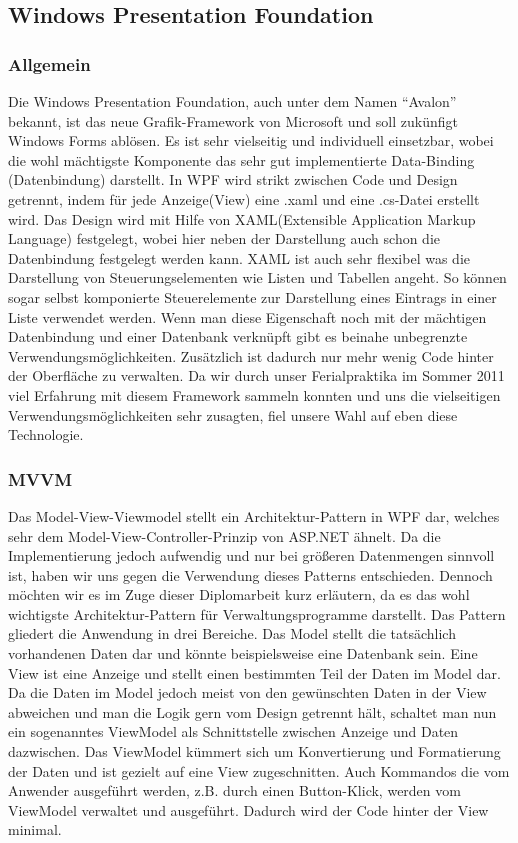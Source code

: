 \subsection{Windows Presentation Foundation}
\subsubsection{Allgemein}
Die Windows Presentation Foundation, auch unter dem Namen “Avalon” bekannt, ist das neue Grafik-Framework von Microsoft und soll zukünfigt Windows Forms ablösen. Es ist sehr vielseitig und individuell einsetzbar, wobei die wohl mächtigste Komponente das sehr gut implementierte Data-Binding (Datenbindung) darstellt. In WPF wird strikt zwischen Code und Design getrennt, indem für jede Anzeige(View) eine .xaml und eine .cs-Datei erstellt wird. 
Das Design wird mit Hilfe von XAML(Extensible Application Markup Language) festgelegt, wobei hier neben der Darstellung auch schon die Datenbindung festgelegt werden kann. XAML ist auch sehr flexibel was die Darstellung von Steuerungselementen wie Listen und Tabellen angeht. So können sogar selbst komponierte Steuerelemente zur Darstellung eines Eintrags in einer Liste verwendet werden. Wenn man diese Eigenschaft noch mit der mächtigen Datenbindung und einer Datenbank verknüpft gibt es beinahe unbegrenzte Verwendungsmöglichkeiten. Zusätzlich ist dadurch nur mehr wenig Code hinter der Oberfläche zu verwalten.
Da wir durch unser Ferialpraktika im Sommer 2011 viel Erfahrung mit diesem Framework sammeln konnten und uns die vielseitigen Verwendungsmöglichkeiten sehr zusagten, fiel unsere Wahl auf eben diese Technologie.
\subsubsection{MVVM}
Das Model-View-Viewmodel stellt ein Architektur-Pattern in WPF dar, welches sehr dem Model-View-Controller-Prinzip von ASP.NET ähnelt. Da die Implementierung jedoch aufwendig und nur bei größeren Datenmengen sinnvoll ist, haben wir uns gegen die Verwendung dieses Patterns entschieden. Dennoch möchten wir es im Zuge dieser Diplomarbeit kurz erläutern, da es das wohl wichtigste Architektur-Pattern für Verwaltungsprogramme darstellt.
Das Pattern gliedert die Anwendung in drei Bereiche. Das Model stellt die tatsächlich vorhandenen Daten dar und könnte beispielsweise eine Datenbank sein. Eine View ist eine Anzeige und stellt einen bestimmten Teil der Daten im Model dar. Da die Daten im Model jedoch meist von den gewünschten Daten in der View abweichen und man die Logik gern vom Design getrennt hält, schaltet man nun ein sogenanntes ViewModel als Schnittstelle zwischen Anzeige und Daten dazwischen. Das ViewModel kümmert sich um Konvertierung und Formatierung der Daten und ist gezielt auf eine View zugeschnitten. Auch Kommandos die vom Anwender ausgeführt werden, z.B. durch einen Button-Klick, werden vom ViewModel verwaltet und ausgeführt. Dadurch wird der Code hinter der View minimal.
